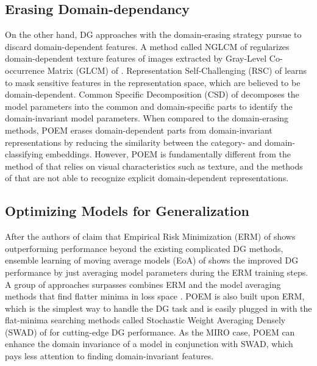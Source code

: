 \documentclass[letterpaper]{article} \usepackage{aaai23}  \usepackage{times}  \usepackage{helvet}  \usepackage{courier}  \usepackage[hyphens]{url}  \usepackage{graphicx} \urlstyle{rm} \def\UrlFont{\rm}  \usepackage{natbib}  \usepackage{caption} \frenchspacing  \setlength{\pdfpagewidth}{8.5in}  \setlength{\pdfpageheight}{11in}  \usepackage[labelsep=period]{caption}
\begin{document}
\subsection{Erasing Domain-dependancy}
On the other hand, DG approaches with the domain-erasing strategy pursue to discard domain-dependent features. 
A method called NGLCM of \cite{regular_1} regularizes domain-dependent texture features of images extracted by Gray-Level Co-occurrence Matrix (GLCM) of \cite{GLCM1,GLCM2}. 
Representation Self-Challenging (RSC) of \cite{RSC} learns to mask sensitive features in the representation space, which are believed to be domain-dependent.
Common Specific Decomposition (CSD) of \cite{decomposition} decomposes the model parameters into the common and domain-specific parts to identify the domain-invariant model parameters.
When compared to the domain-erasing methods, POEM erases domain-dependent parts from domain-invariant representations by reducing the similarity between the category- and domain-classifying embeddings. However, POEM is fundamentally different from the method of \cite{regular_1} that relies on visual characteristics such as texture, and the methods of \cite{RSC, decomposition} that are not able to recognize explicit domain-dependent representations.

\subsection{Optimizing Models for Generalization}
After the authors of \cite{Domainbed} claim that Empirical Risk Minimization (ERM) of \cite{ERM} shows outperforming performance beyond the existing complicated DG methods, ensemble learning of moving average models (EoA) of \cite{EoA} shows the improved DG performance by just averaging model parameters during the ERM training steps.
A group of approaches surpasses combines ERM and the model averaging methods that find flatter minima in loss space \cite{swa,SWAD}.
POEM is also built upon ERM, which is the simplest way to handle the DG task and is easily plugged in with the flat-minima searching methods called Stochastic Weight Averaging Densely (SWAD) of \cite{SWAD} for cutting-edge DG performance.
As the MIRO case, POEM can enhance the domain invariance of a model in conjunction with SWAD, which pays less attention to finding domain-invariant features.
\end{document}
